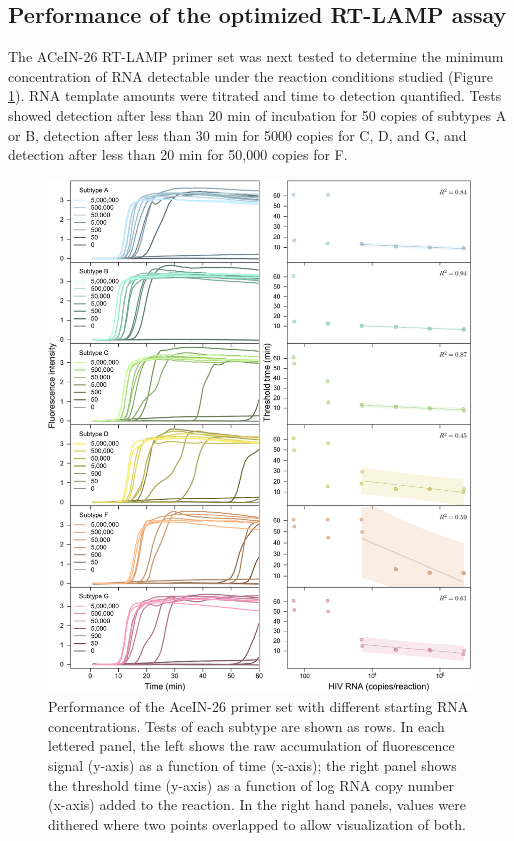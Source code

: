 \documentclass[../sherrill-Mix_thesis.tex]{subfiles}
\begin{document}
			\subsection{Performance of the optimized RT-LAMP assay}
			The ACeIN-26 RT-LAMP primer set was next tested to determine the minimum concentration of RNA detectable under the reaction conditions studied (Figure \ref{figClades}). RNA template amounts were titrated and time to detection quantified. Tests showed detection after less than 20 min of incubation for 50 copies of subtypes A or B, detection after less than 30 min for 5000 copies for C, D, and G, and detection after less than 20 min for 50,000 copies for F.

			\begin{figure}
			\centering
				\includegraphics[width=\textwidth]{3.pdf} %
			\caption[Performance of the AceIN-26 primer set with different starting RNA concentrations]{Performance of the AceIN-26 primer set with different starting RNA concentrations. Tests of each subtype are shown as rows. In each lettered panel, the left shows the raw accumulation of fluorescence signal (y-axis) as a function of time (x-axis); the right panel shows the threshold time (y-axis) as a function of log RNA copy number (x-axis) added to the reaction. In the right hand panels, values were dithered where two points overlapped to allow visualization of both.}
			\label{figClades}
			\end{figure}
\end{document}
